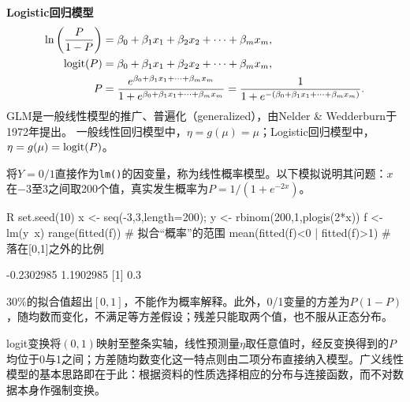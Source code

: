 \textbf{Logistic回归模型}
\begin{align*}
\ln\left(\frac P{1-P}\right)&=\beta_0+\beta_1x_1+\beta_2x_2+\cdots+\beta_mx_m,\\
\operatorname{logit}(P)&=\beta_0+\beta_1x_1+\beta_2x_2+\cdots+\beta_mx_m,\\
P&=\frac{e^{\beta_0+\beta_1x_1+\cdots+\beta_mx_m}}{1+e^{\beta_0+\beta_1x_1+\cdots+\beta_mx_m}}
 =\frac{1}{1+e^{-(\beta_0+\beta_1x_1+\cdots+\beta_mx_m)}}.
\end{align*}
GLM是一般线性模型的推广、普遍化（generalized），由Nelder \& Wedderburn于1972年提出。
一般线性回归模型中，$\eta=g(\mu)=\mu$；Logistic回归模型中，$\eta=g(\mu)=\operatorname{logit}(P)$。
\begin{sikao}[0/1结局不宜直接采用线性回归]
将$Y=0/1$直接作为\texttt{lm()}的因变量，称为线性概率模型。以下模拟说明其问题：$x$在$-3$至$3$之间取200个值，真实发生概率为$P=1/(1+e^{-2x})$。
\par\noindent
\begin{coursecode}{R}
set.seed(10)
x <- seq(-3,3,length=200); y <- rbinom(200,1,plogis(2*x))
f <- lm(y~x)
range(fitted(f))                      # 拟合“概率”的范围
mean(fitted(f)<0 | fitted(f)>1)       # 落在[0,1]之外的比例
\end{coursecode}
\begin{routput}
[1] -0.2302985  1.1902985
[1] 0.3
\end{routput}
30\%的拟合值超出$[0,1]$，不能作为概率解释。此外，0/1变量的方差为$P(1-P)$，随均数而变化，不满足等方差假设；残差只能取两个值，也不服从正态分布。

logit变换将$(0,1)$映射至整条实轴，线性预测量$\eta$取任意值时，经反变换得到的$P$均位于0与1之间；方差随均数变化这一特点则由二项分布直接纳入模型。广义线性模型的基本思路即在于此：根据资料的性质选择相应的分布与连接函数，而不对数据本身作强制变换。
\end{sikao}
